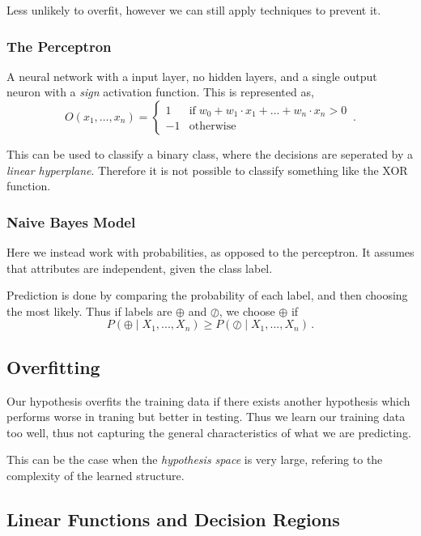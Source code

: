 Less unlikely to overfit, however we can still apply techniques to prevent it.

\subsubsection{The Perceptron}

A neural network with a input layer, no hidden layers, and a single output neuron with a \emph{sign} activation function.
This is represented as,
\[
    O(x_1, \dots, x_n) = \left\{
        \begin{array}{ll}
            1 & \mathrm{if}\; w_0 + w_1 \cdot x_1 + \dots + w_n \cdot x_n > 0 \\
            -1 & \mathrm{otherwise}
        \end{array}
        \right.\,.
\]

This can be used to classify a binary class, where the decisions are seperated by a \emph{linear hyperplane}.
Therefore it is not possible to classify something like the XOR function.

\subsubsection{Naive Bayes Model}

Here we instead work with probabilities, as opposed to the perceptron.
It assumes that attributes are independent, given the class label.

Prediction is done by comparing the probability of each label, and then choosing the most likely.
Thus if labels are $\oplus$ and $\oslash$, we choose $\oplus$ if
\[
    P(\oplus \mid X_1, ..., X_n) \geq P(\oslash \mid X_1, ..., X_n)\,.
\]

\subsection{Overfitting}

Our hypothesis overfits the training data if there exists another hypothesis which performs worse in traning but better in testing.
Thus we learn our training data too well, thus not capturing the general characteristics of what we are predicting.

This can be the case when the \emph{hypothesis space} is very large, refering to the complexity of the learned structure.

\subsection{Linear Functions and Decision Regions}

